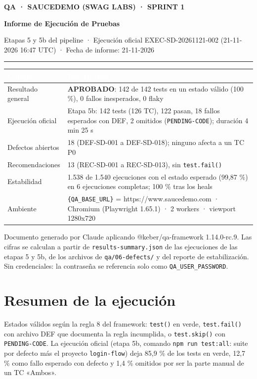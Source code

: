 \documentclass[10pt,a4paper]{article}
\newcommand{\tabhead}{\rowcolor{primary}}
\newcommand{\hcell}[1]{\textcolor{white}{\bfseries #1}}
\newcommand{\zebrarows}{\rowcolors{2}{zebra}{white}}
\newcommand{\status}[1]{\textcolor{secondary}{\bfseries #1}}
\newcommand{\reportcover}[3]{%
  \thispagestyle{first}%
  {\color{primary}\small\bfseries #1}\par\vspace{4pt}
  {\raggedright\fontsize{22}{28}\selectfont\bfseries\color{ink} #2\par}\vspace{6pt}
  {\small\color{muted} #3}\par\vspace{6pt}
  {\color{primary}\rule{\textwidth}{1pt}}\par
}
\begin{document}
\small

\reportcover
  {QA · SAUCEDEMO (SWAG LABS) · SPRINT 1}
  {Informe de Ejecución de Pruebas}
  {Etapas 5 y 5b del pipeline · Ejecución oficial EXEC-SD-20261121-002 (21-11-2026 16:47 UTC) · Fecha de informe: 21-11-2026}

{\zebrarows
\begin{tabularx}{\textwidth}{|L{0.24\textwidth}|Y|}
\hline
\tabhead \hcell{Campo} & \hcell{Descripción} \\ \hline
Resultado general & \status{APROBADO}: 142 de 142 tests en un estado válido (100 \%), 0 fallos inesperados, 0 flaky \\ \hline
Ejecución oficial & Etapa 5b: 142 tests (126 TC), 122 pasan, 18 fallos esperados con DEF, 2 omitidos (\texttt{PENDING-CODE}); duración 4 min 25 s \\ \hline
Defectos abiertos & 18 (DEF-SD-001 a DEF-SD-018); ninguno afecta a un TC P0 \\ \hline
Recomendaciones & 13 (REC-SD-001 a REC-SD-013), sin \texttt{test.fail()} \\ \hline
Estabilidad & 1.538 de 1.540 ejecuciones con el estado esperado (99,87 \%) en 6 ejecuciones completas; 100 \% tras los heals \\ \hline
Ambiente & \texttt{\{QA\_BASE\_URL\}} = https://www.saucedemo.com · Chromium (Playwright 1.65.1) · 2 workers · viewport 1280x720 \\ \hline
\end{tabularx}}

\begin{infonote}
Documento generado por Claude aplicando @keber/qa-framework 1.14.0-rc.9. Las cifras se calculan a partir de \texttt{results-summary.json} de las ejecuciones de las etapas 5 y 5b, de los archivos de \texttt{qa/06-defects/} y del reporte de estabilización. Sin credenciales: la contraseña se referencia solo como \texttt{QA\_USER\_PASSWORD}.
\end{infonote}

\section{Resumen de la ejecución}
Estados válidos según la regla 8 del framework: \texttt{test()} en verde, \texttt{test.fail()} con archivo DEF que documenta la regla incumplida, o \texttt{test.skip()} con \texttt{PENDING-CODE}. La ejecución oficial (etapa 5b, comando \texttt{npm run test:all}: suite por defecto más el proyecto \texttt{login-flow}) deja 85,9 \% de los tests en verde, 12,7 \% como fallo esperado con defecto y 1,4 \% omitidos por ser la parte manual de un TC «Ambos».
\end{document}
